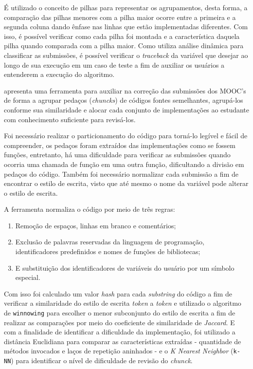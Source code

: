     É utilizado o conceito de pilhas para representar os agrupamentos, desta forma,
    a comparação das pilhas menores com a pilha maior ocorre entre a primeira e a
    segunda coluna dando ênfase nas linhas que estão implementadas diferentes. Com
    isso, é possível verificar como cada pilha foi montada e a característica daquela
    pilha quando comparada com a pilha maior. Como utiliza análise dinâmica para
    classificar as submissões, é possível verificar o \textit{traceback} da
    variável que desejar ao longo de sua execução em um caso de teste a fim de
    auxiliar os usuários a entenderem a execução do algoritmo.
    
     apresenta uma ferramenta para auxiliar na correção das
    submissões dos MOOC's de forma a agrupar pedaços (\textit{chuncks}) de códigos
    fontes semelhantes, agrupá-los conforme sua similaridade e alocar cada conjunto
    de implementações ao estudante com conhecimento suficiente para revisá-los.
    
    Foi necessário realizar o particionamento do código para torná-lo legível
    e fácil de compreender, os pedaços foram extraídos das implementações como
    se fossem funções, entretanto, há uma dificuldade para verificar as submissões
    quando ocorria uma chamada de função em uma outra função, dificultando a divisão
    em pedaços do código. Também foi necessário normalizar cada submissão a fim de
    encontrar o estilo de escrita, visto que até mesmo o nome da variável pode
    alterar o estilo de escrita.
    
    A ferramenta\cite{Wei2015} normaliza o código por meio de três regras:
    \begin{enumerate}
    	\item Remoção de espaços, linhas em branco e comentários;
    	\item Exclusão de palavras reservadas da linguagem de programação,
    	identificadores predefinidos e nomes de funções de bibliotecas;
    	\item E substituição dos identificadores de variáveis do usuário por um
    	símbolo especial.
    \end{enumerate}
    Com isso foi calculado um valor \textit{hash} para cada \textit{substring}
    do código a fim de verificar a similaridade do estilo de escrita \textit{token}
    a \textit{token} e utilizado o algoritmo de \texttt{winnowing} para escolher
    o menor subconjunto do estilo de escrita a fim de realizar as comparações
    por meio do coeficiente de similaridade de \textit{Jaccard}. E com a finalidade
    de identificar a dificuldade da implementação, foi utilizado a distância
    Euclidiana para comparar as características extraídas - quantidade de métodos
    invocados e laços de repetição aninhados - e o \textit{K Nearest Neighbor}
    (\texttt{k-NN}) para identificar o nível de dificuldade de revisão do
    \textit{chunck}.
    
